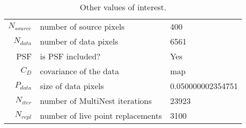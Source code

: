\begin{table*}[!htb]\caption{Other values of interest.}\begin{center}\begin{tabular}{ r l l }\hline $N_{source}$ & number of source pixels           & 400 \\ 
 $N_{data}$   & number of data pixels             & 6561 \\ 
 PSF & is PSF included?                          & Yes \\
 $C_D$        & covariance of the data            & map \\ 
 $P_{data}$   & size of data pixels               & 0.050000002354751 \\ 
 $N_{iter}$   & number of MultiNest iterations    & 23923 \\ 
 $N_{repl}$   & number of live point replacements & 3100 \\ 
\hline\end{tabular}\end{center}\label{tab:3}\end{table*}